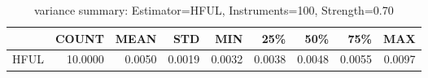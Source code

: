 \begin{table}[ht]
\centering
\caption{variance summary: Estimator=HFUL, Instruments=100, Strength=0.70}
\begin{tabular}{lrrrrrrrr}
\toprule
 & COUNT & MEAN & STD & MIN & 25\% & 50\% & 75\% & MAX \\
\midrule
HFUL & 10.0000 & 0.0050 & 0.0019 & 0.0032 & 0.0038 & 0.0048 & 0.0055 & 0.0097 \\
\bottomrule
\end{tabular}
\end{table}
